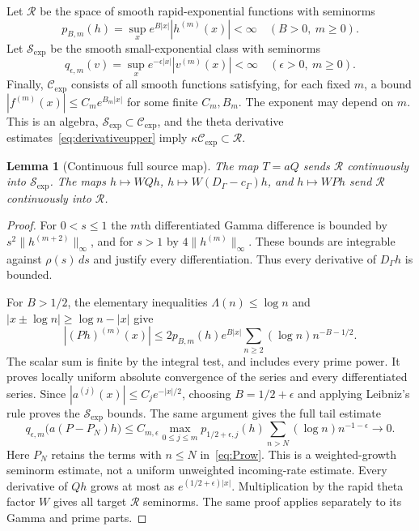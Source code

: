 \documentclass[11pt,a4paper]{article}
\numberwithin{equation}{section}
\newtheorem{lemma}[theorem]{Lemma}
\theoremstyle{definition}
\theoremstyle{remark}
\newcommand{\cg}{c_{\Gamma}}
\newcommand{\norm}[1]{\lVert #1\rVert}
\newcommand{\RR}{\mathcal R}
\newcommand{\SSS}{\mathcal S_{\!\exp}}
\newcommand{\CE}{\mathcal C_{\exp}}
\begin{document}
Let $\RR$ be the space of smooth rapid-exponential functions with seminorms
\[
 p_{B,m}(h)=\sup_x e^{B|x|}|h^{(m)}(x)|<\infty
 \quad(B>0,\ m\ge0).
\]
Let $\SSS$ be the smooth small-exponential class with seminorms
\[
 q_{\epsilon,m}(v)=\sup_xe^{-\epsilon|x|}|v^{(m)}(x)|<\infty
 \quad(\epsilon>0,\ m\ge0).
\]
Finally, $\CE$ consists of all smooth functions satisfying, for each fixed $m$, a bound $|f^{(m)}(x)|\le C_m e^{B_m|x|}$ for some finite $C_m,B_m$. The exponent may depend on $m$. This is an algebra, $\SSS\subset\CE$, and the theta derivative estimates~\eqref{eq:derivativeupper} imply $\kappa\CE\subset\RR$.

\begin{lemma}[Continuous full source map]\label{lem:T}
The map $T=aQ$ sends $\RR$ continuously into $\SSS$. The maps $h\mapsto WQh$, $h\mapsto W(D_\Gamma-\cg)h$, and $h\mapsto WPh$ send $\RR$ continuously into $\RR$.
\end{lemma}
\begin{proof}
For $0<s\le1$ the $m$th differentiated Gamma difference is bounded by $s^2\norm{h^{(m+2)}}_\infty$, and for $s>1$ by $4\norm{h^{(m)}}_\infty$. These bounds are integrable against $\rho(s)\,ds$ and justify every differentiation. Thus every derivative of $D_\Gamma h$ is bounded.

For $B>1/2$, the elementary inequalities $\Lambda(n)\le\log n$ and $|x\pm\log n|\ge\log n-|x|$ give
\begin{equation}\label{eq:primepoint}
 |(Ph)^{(m)}(x)|\le
  2p_{B,m}(h)e^{B|x|}\sum_{n\ge2}(\log n)n^{-B-1/2}.
\end{equation}
The scalar sum is finite by the integral test, and includes every prime power. It proves locally uniform absolute convergence of the series and every differentiated series. Since $|a^{(j)}(x)|\le C_j e^{-|x|/2}$, choosing $B=1/2+\epsilon$ and applying Leibniz's rule proves the $\SSS$ bounds. The same argument gives the full tail estimate
\begin{equation}\label{eq:primetailpoint}
 q_{\epsilon,m}\bigl(a(P-P_N)h\bigr)
 \le C_{m,\epsilon}\max_{0\le j\le m}p_{1/2+\epsilon,j}(h)
           \sum_{n>N}(\log n)n^{-1-\epsilon}\longrightarrow0.
\end{equation}
Here $P_N$ retains the terms with $n\le N$ in~\eqref{eq:Prow}. This is a weighted-growth seminorm estimate, not a uniform unweighted incoming-rate estimate. Every derivative of $Qh$ grows at most as $e^{(1/2+\epsilon)|x|}$. Multiplication by the rapid theta factor $W$ gives all target $\RR$ seminorms. The same proof applies separately to its Gamma and prime parts.
\end{proof}
\end{document}
